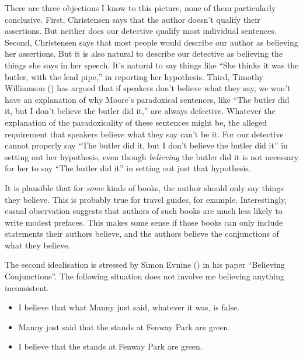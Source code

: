 \documentclass[
  11pt,
  letterpaper,
  DIV=11,
  numbers=noendperiod,
  oneside]{scrartcl}
\begin{document}
There are three objections I know to this picture, none of them
particularly conclusive. First, Christensen says that the author doesn't
qualify their assertions. But neither does our detective qualify most
individual sentences. Second, Christensen says that most people would
describe our author as believing her assertions. But it is also natural
to describe our detective as believing the things she says in her
speech. It's natural to say things like ``She thinks it was the butler,
with the lead pipe,'' in reporting her hypothesis. Third, Timothy
Williamson () has argued that
if speakers don't believe what they say, we won't have an explanation of
why Moore's paradoxical sentences, like ``The butler did it, but I don't
believe the butler did it,'' are always defective. Whatever the
explanation of the paradoxicality of these sentences might be, the
alleged requirement that speakers believe what they say can't be it. For
our detective cannot properly say ``The butler did it, but I don't
believe the butler did it'' in setting out her hypothesis, even though
\emph{believing} the butler did it is not necessary for her to say ``The
butler did it'' in setting out just that hypothesis.

It is plausible that for \emph{some} kinds of books, the author should
only say things they believe. This is probably true for travel guides,
for example. Interestingly, casual observation suggests that authors of
such books are much less likely to write modest prefaces. This makes
some sense if those books can only include statements their authors
believe, and the authors believe the conjunctions of what they believe.

The second idealisation is stressed by Simon Evnine
() in his paper ``Believing
Conjunctions''. The following situation does not involve me believing
anything inconsistent.

\begin{itemize}
\item
  I believe that what Manny just said, whatever it was, is false.
\item
  Manny just said that the stands at Fenway Park are green.
\item
  I believe that the stands at Fenway Park are green.
\end{itemize}
\end{document}
